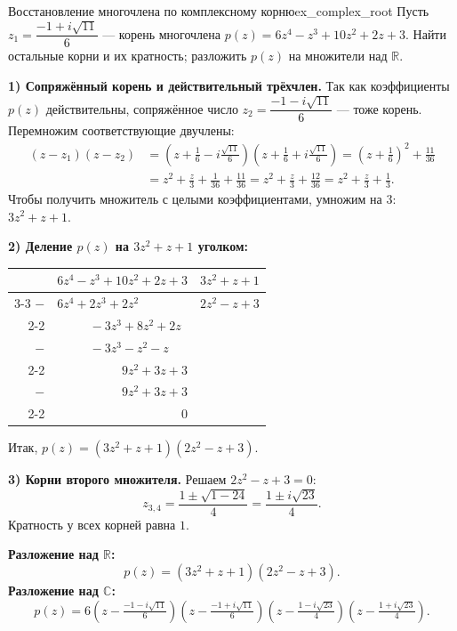 \documentclass[12pt,a4paper]{article}
\begin{document}
\begin{definition}{Восстановление многочлена по комплексному
корню}{ex_complex_root}
Пусть $z_1 = \dfrac{-1 + i\sqrt{11}}{6}$ — корень многочлена
$p(z) = 6z^4 - z^3 + 10z^2 + 2z + 3$. Найти остальные корни и их
кратность; разложить $p(z)$ на множители над $\mathbb{R}$.

\medskip
\textbf{1) Сопряжённый корень и действительный трёхчлен.} Так как
коэффициенты $p(z)$ действительны, сопряжённое число
$z_2 = \dfrac{-1 - i\sqrt{11}}{6}$ — тоже корень. Перемножим
соответствующие двучлены:
\begin{align*}
(z - z_1)(z - z_2)
&= \left(z + \tfrac{1}{6} - i\tfrac{\sqrt{11}}{6}\right)
\left(z + \tfrac{1}{6} + i\tfrac{\sqrt{11}}{6}\right)
= \left(z + \tfrac{1}{6}\right)^2 + \tfrac{11}{36} \\
&= z^2 + \tfrac{z}{3} + \tfrac{1}{36} + \tfrac{11}{36}
= z^2 + \tfrac{z}{3} + \tfrac{12}{36}
= z^2 + \tfrac{z}{3} + \tfrac{1}{3}.
\end{align*}
Чтобы получить множитель с целыми коэффициентами, умножим на $3$:
$3z^2 + z + 1$.

\textbf{2) Деление $p(z)$ на $3z^2 + z + 1$ уголком:}
\begin{center}
\renewcommand{\arraystretch}{1.3}
\begin{tabular}{r@{\;}l|l}
& $6z^4 - z^3 + 10z^2 + 2z + 3$ & \;$3z^2 + z + 1$ \\
\cline{3-3}
$-$ & $6z^4 + 2z^3 + 2z^2$ & \;$2z^2 - z + 3$ \\
\cline{2-2}
& $\phantom{6z^4+}-3z^3 + 8z^2 + 2z$ & \\
$-$ & $\phantom{6z^4+}-3z^3 - z^2 - z$ & \\
\cline{2-2}
& $\phantom{6z^4-3z^3+}9z^2 + 3z + 3$ & \\
$-$ & $\phantom{6z^4-3z^3+}9z^2 + 3z + 3$ & \\
\cline{2-2}
& $\phantom{6z^4-3z^3+9z^2+3z+}0$ & \\
\end{tabular}
\end{center}
Итак, $p(z) = (3z^2 + z + 1)(2z^2 - z + 3)$.

\textbf{3) Корни второго множителя.} Решаем $2z^2 - z + 3 = 0$:
\[
z_{3,4} = \frac{1 \pm \sqrt{1 - 24}}{4} = \frac{1 \pm i\sqrt{23}}{4}.
\]
Кратность у всех корней равна $1$.

\textbf{Разложение над $\mathbb{R}$:}
\[
p(z) = (3z^2 + z + 1)(2z^2 - z + 3).
\]
\textbf{Разложение над $\mathbb{C}$:}
\[
p(z) = 6\left(z - \tfrac{-1 - i\sqrt{11}}{6}\right)
\left(z - \tfrac{-1 + i\sqrt{11}}{6}\right)
\left(z - \tfrac{1 - i\sqrt{23}}{4}\right)
\left(z - \tfrac{1 + i\sqrt{23}}{4}\right).
\]
\end{definition}
\end{document}
